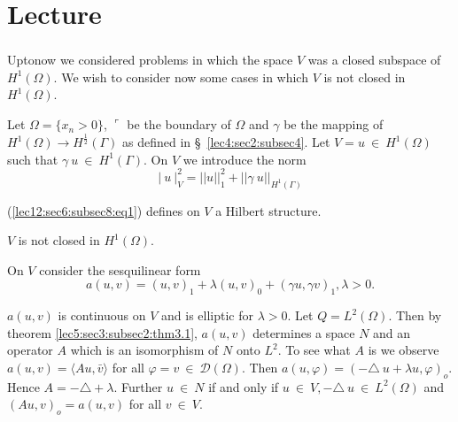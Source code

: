 
\chapter{Lecture}\label{lec12}%
\setcounter{section}{6}

\subsection{}\label{lec12:sec6:subsec8} %

Upto\pageoriginale now we considered problems in which the
space $V$ was a closed 
 subspace of $H^1(\Omega)$. We wish to consider now some cases in
 which $V$ is not closed in $H^1(\Omega)$. 

Let $\Omega = \{ x_n > 0 \}$, $\ulcorner$ be the boundary of $\Omega$
and $\gamma$ be the mapping of $H^1(\Omega) \rightarrow
H^{\frac{1}{2}}(\Gamma)$ as defined in \S\ \ref{lec4:sec2:subsec4}. Let $V = u ~
\in ~ H^1 (\Omega)$ such that $\gamma ~ u ~ \in ~
H^1(\Gamma)$. On $V$ we introduce the norm 
\begin{equation}
  | ~ u ~ |^2_V  = || u ||^2_1 + || \gamma ~ u ||_{H^1(\Gamma)}\tag{1}\label{lec12:sec6:subsec8:eq1} 
\end{equation}

\begin{lemma}\label{lec12:sec6:subsec8:lem6.5}%
  (\ref{lec12:sec6:subsec8:eq1}) defines on $V$ a Hilbert structure.
\end{lemma}

\begin{remark*} %
  $V$ is not closed in $H^1(\Omega)$.
\end{remark*}

On $V$ consider the sesquilinear form
$$
a(u,v) = (u,v)_1 + \lambda(u,v)_0 + (\gamma u,\gamma v)_1, \lambda > 0.
$$
\begin{lemma}\label{lec12:sec6:subsec8:lem6.6}%
  $a(u,v)$ is continuous on $V$ and is elliptic for $\lambda > 0$. Let
  $Q = L^2(\Omega)$. Then by theorem \ref{lec5:sec3:subsec2:thm3.1}, $a(u,v)$ determines a
  space $N$ and an operator $A$ which is an isomorphism of $N$ onto
  $L^2$. To see what $A$ is we observe $a(u,v) = \langle
  Au,\bar{v}\rangle$ for all $\varphi = v ~ \in ~ \mathscr{D}
  (\Omega)$. Then $a(u,\varphi) = (- \triangle ~ u + \lambda u,
  \varphi)_o$. Hence $A = - \triangle + \lambda$. Further $u ~
  \in ~ N$ if and only if $u ~ \in ~ V , - \triangle ~
  u ~ \in ~ L^2(\Omega)$ and $(Au,v)_o = a(u,v)$ for all $v ~
  \in ~ V$. 
\end{lemma}

